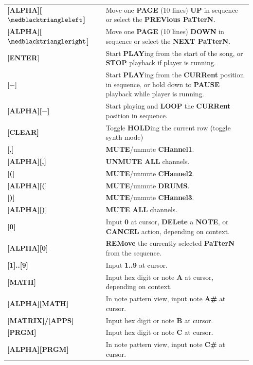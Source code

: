 \documentclass[12pt]{report}	%
\begin{document}
\begin{longtable}{p{} p{} }
\textbf{[ALPHA][\(\medblacktriangleleft\)]} & Move one \textbf{PAGE} (10 lines) \textbf{UP} in sequence or select the \textbf{PREVious PaTterN}. \\
\textbf{[ALPHA][\(\medblacktriangleright\)]} & Move one \textbf{PAGE} (10 lines) \textbf{DOWN} in sequence or select the \textbf{NEXT PaTterN}. \\
\hline
\textbf{[ENTER]} & Start \textbf{PLAY}ing from the start of the song, or \textbf{STOP} playback if player is running. \\
\textbf{[$\bm{-}$]} & Start \textbf{PLAY}ing from the \textbf{CURRent} position in sequence, or hold down to \textbf{PAUSE} playback while player is running. \\
\textbf{[ALPHA][$\bm{-}$]} & Start playing and \textbf{LOOP} the \textbf{CURRent} position in sequence. \\
\textbf{[CLEAR]} & Toggle \textbf{HOLD}ing the current row (toggle synth mode) \\
\hline
\textbf{[,]} & \textbf{MUTE}/unmute \textbf{CHannel1}. \\
\textbf{[ALPHA][,]} & \textbf{UNMUTE ALL} channels. \\
\textbf{[(]} & \textbf{MUTE}/unmute \textbf{CHannel2}. \\
\textbf{[ALPHA][(]} & \textbf{MUTE}/unmute \textbf{DRUMS}. \\
\textbf{[)]} & \textbf{MUTE}/unmute \textbf{CHannel3}. \\
\textbf{[ALPHA][)]} & \textbf{MUTE ALL} channels. \\
\hline
\textbf{[0]} & Input \textbf{0} at cursor, \textbf{DELete} a \textbf{NOTE}, or \textbf{CANCEL} action, depending on context. \\
\textbf{[ALPHA][0]} & \textbf{REMove} the currently selected \textbf{PaTterN} from the sequence. \\
\textbf{[1]..[9]} & Input \textbf{1..9} at cursor. \\
\textbf{[MATH]} & Input hex digit or note \textbf{A} at cursor, depending on context. \\
\textbf{[ALPHA][MATH]} & In note pattern view, input note \textbf{A\#} at cursor. \\
\textbf{[MATRIX]/[APPS]} & Input hex digit or note \textbf{B} at cursor. \\
\textbf{[PRGM]} & Input hex digit or note \textbf{C} at cursor. \\
\textbf{[ALPHA][PRGM]} & In note pattern view, input note \textbf{C\#} at cursor. \\

\end{longtable}
\end{document}
